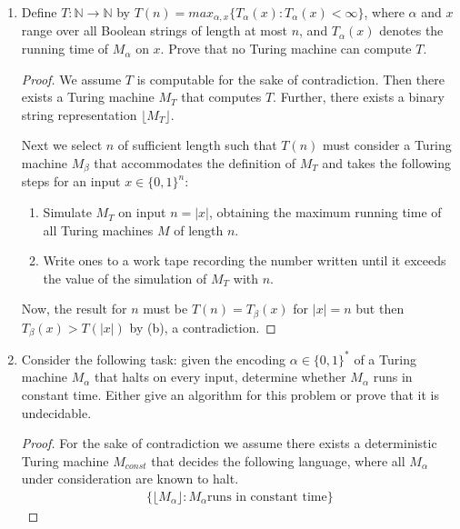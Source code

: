 \documentclass[usletter]{article}
\begin{document}
\begin{enumerate}
\begin{proof}
    \end{proof}

  \item Define $T : \mathbb{N} \rightarrow \mathbb{N}$ by $T(n) = max_{\alpha,x}\{T_{\alpha}(x) : T_{\alpha}(x) < \infty \}$, where $\alpha$ and $x$ range over all Boolean strings of length at most $n$, and $T_{\alpha}(x)$ denotes the running time of $M_{\alpha}$ on $x$. Prove that no Turing machine can compute $T$.

    \begin{proof}
      We assume $T$ is computable for the sake of contradiction. Then there exists a Turing machine $M_T$ that computes $T$. Further, there exists a binary string representation $\lfloor M_T \rfloor$.

      Next we select $n$ of sufficient length such that $T(n)$ must consider a Turing machine $M_{\beta}$ that accommodates the definition of $M_T$ and takes the following steps for an input $x \in \{0,1\}^n$:
      \begin{enumerate}
        \item Simulate $M_T$ on input $n = |x|$, obtaining the maximum running time of all Turing machines $M$ of length $n$.
        \item Write ones to a work tape recording the number written until it exceeds the value of the simulation of $M_T$ with $n$.
      \end{enumerate}

      Now, the result for $n$ must be $T(n) = T_{\beta}(x)$ for $|x| = n$ but then $T_{\beta}(x) > T(|x|)$ by (b), a contradiction.
    \end{proof}

  \item Consider the following task: given the encoding $\alpha \in \{0,1\}^*$ of a Turing machine $M_{\alpha}$ that halts on every input, determine whether $M_{\alpha}$ runs in constant time. Either give an algorithm for this problem or prove that it is undecidable.

      \begin{proof}
        For the sake of contradiction we assume there exists a deterministic Turing machine $M_{const}$ that decides the following language, where all $M_{\alpha}$ under consideration are known to halt.
        \begin{align}
          \{ \lfloor M_{\alpha} \rfloor : M_{\alpha} \text{runs in constant time} \}
        \end{align}


\end{proof}
\end{enumerate}
\end{document}
